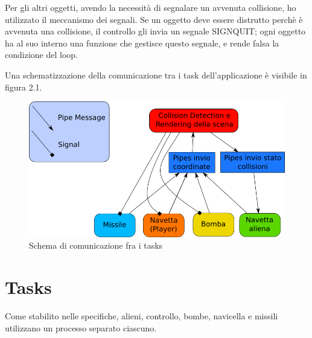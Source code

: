 \documentclass[a4paper,11pt]{report}
\begin{document}
Per gli altri oggetti, avendo la necessità di segnalare un avvenuta collisione, ho utilizzato il
meccanismo dei segnali. Se un oggetto deve essere distrutto perchè è avvenuta una collisione, 
il controllo gli invia un segnale SIGNQUIT; ogni oggetto ha al suo interno una funzione che 
gestisce questo segnale, e rende falsa la condizione del loop.

Una schematizzazione della comunicazione tra i task dell'applicazione è visibile in figura 2.1.

\begin{center}
\begin{figure}
\begin{center}
\includegraphics[scale=0.50]{comunication.png}
\end{center}
\caption{Schema di comunicazione fra i tasks}
\end{figure}
\end{center}

\section{Tasks}
Come stabilito nelle specifiche, alieni, controllo, bombe, navicella e missili utilizzano
un processo separato ciascuno.
\end{document}
